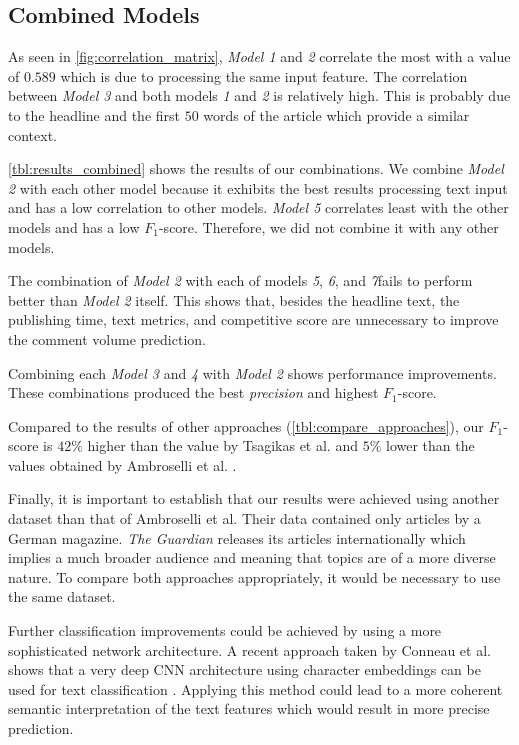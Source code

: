 \subsection{Combined Models}
As seen in \autoref{fig:correlation_matrix}, \textit{Model 1} and \textit{2} correlate the most with a value of $0.589$ which is due to processing the same input feature.
The correlation between \textit{Model 3} and both models \textit{1} and \textit{2} is relatively high. 
This is probably due to the headline and the first $50$ words of the article which provide a similar context.

\autoref{tbl:results_combined} shows the results of our combinations. We combine \textit{Model 2} with each other model because it exhibits the best results processing text input and has a low correlation to other models.
\textit{Model 5} correlates least with the other models and has a low $F_1$-score. Therefore, we did not combine it with any other models.



The combination of \textit{Model 2} with each of models \textit{5}, \textit{6}, and \textit{7}fails to perform better than \textit{Model 2} itself. 
This shows that, besides the headline text, the publishing time, text metrics, and competitive score are unnecessary to improve the comment volume prediction.

Combining each \textit{Model 3} and \textit{4} with \textit{Model 2} shows performance improvements. 
These combinations produced the best \textit{precision} and highest $F_1$-score.

Compared to the results of other approaches (\autoref{tbl:compare_approaches}), our $F_1$-score is $42\%$ higher than the value by Tsagikas et al. and $5\%$ lower than the values obtained by Ambroselli et al. \cite{ambroselli2018prediction}.



Finally, it is important to establish that our results were achieved using another dataset than that of Ambroselli et al. 
Their data contained only articles by a German magazine. 
\textit{The Guardian} releases its articles internationally which implies a much broader audience and meaning that topics are of a more diverse nature.
To compare both approaches appropriately, it would be necessary to use the same dataset.

Further classification improvements could be achieved by using a more sophisticated network architecture. 
A recent approach taken by Conneau et al. shows that a very deep CNN architecture using character embeddings can be used for text classification \cite{conneau2016very}. 
Applying this method could lead to a more coherent semantic interpretation of the text features which would result in more precise prediction.